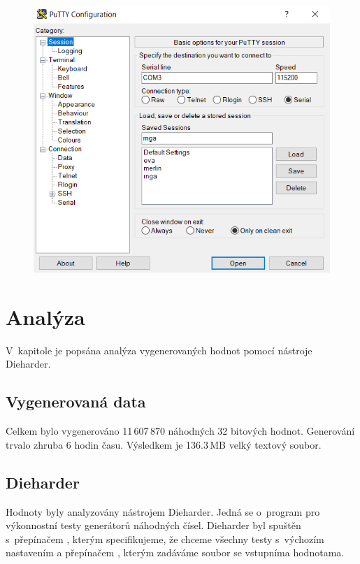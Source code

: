 \documentclass[11pt, a4paper, titlepage]{article}
\begin{document}
\begin{figure}[H]
    \centering
    \begin{minipage}{.5\textwidth}
    \centering
    \includegraphics[width=.97\textwidth]{images/putty_3.png}
    \label{fig:putty_3}
    \end{minipage}
\end{figure}


\section{Analýza}

V~kapitole je popsána analýza vygenerovaných hodnot pomocí nástroje Dieharder.

\subsection{Vygenerovaná data}
Celkem bylo vygenerováno 11\,607\,870 náhodných 32 bitových hodnot. Generování trvalo zhruba 6 hodin času. Výsledkem je 136.3\,MB velký textový soubor.

\subsection{Dieharder}
Hodnoty byly analyzovány nástrojem Dieharder. Jedná se o~program pro výkonnostní testy generátorů náhodných čísel. Dieharder byl spuštěn s~přepínačem , kterým specifikujeme, že chceme všechny testy s~výchozím nastavením a přepínačem , kterým zadáváme soubor se vstupníma hodnotama. \cite{DIEHARDER}
\end{document}
